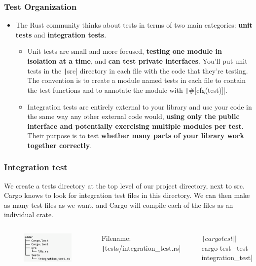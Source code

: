 \documentclass{beamer}
\begin{document}
\begin{frame}[fragile]
	\frametitle{Test Organization}
	\begin{itemize}
		\item The Rust community thinks about tests in terms of two main categories: \textbf{unit tests} and \textbf{integration tests}. 
			\begin{itemize}
		\item Unit tests are small and more focused, \textbf{testing one module in isolation at a time}, and \textbf{can test private interfaces}.  You’ll put unit tests in the \texttt|src| directory in each file with the code that they’re testing. The convention is to create a module named tests in each file to contain the test functions and to annotate the module with \texttt|#[cfg(test)]|.
		\item Integration tests are entirely external to your library and use your code in the same way any other external code would,\textbf{ using only the public interface and potentially exercising multiple modules per test}. Their purpose is to test \textbf{whether many parts of your library work together correctly}.
	\end{itemize}
\end{itemize}
\end{frame}


\begin{frame}[fragile]
	\frametitle{Integration test}
	We create a tests directory at the top level of our project directory, next to src. Cargo knows to look for integration test files in this directory. We can then make as many test files as we want, and Cargo will compile each of the files as an individual crate.
	

\begin{columns}
			\begin{figure}
		\centering
		\includegraphics[width=0.8\linewidth]{img/test.png}
	\end{figure}
	\scriptsize
Filename: \texttt|tests/integration_test.rs|
\inputminted[fontsize=\scriptsize]{rust}{./code/test9.rs}

 \texttt|$ cargo test|
 
 \texttt|$ cargo test --test integration_test|
\end{columns}
\end{frame}
\end{document}
